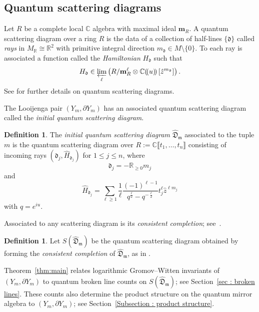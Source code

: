 \documentclass[11pt]{amsart}
\numberwithin{equation}{section}
\theoremstyle{plain}
\theoremstyle{remark}
\theoremstyle{definition}
\newtheorem{definition}[theorem]{Definition}
\newcommand\fd{\mathfrak d}
\newcommand\fD{\mathfrak D}
\newcommand\fm{\mathfrak m}
\newcommand{\CC}{\mathbb{C}}
\newcommand{\RR}{\mathbb{R}}
\begin{document}
\subsection{Quantum scattering diagrams}\label{Section : Quantum scattering diagrams}
Let $R$ be a complete local $\mathbb{C}$ algebra with maximal ideal $\mathbf{m}_R$. A quantum scattering diagram over a ring $R$ is the data of a collection of half-lines $\{\mathfrak{d}\}$ called \textit{rays} in $M_{\RR} \cong \mathbb{R}^2$ with primitive integral direction $m_{\mathfrak{d}} \in M\setminus \{0\}$. To each ray is associated a function called the \textit{Hamiltonian} $H_{\mathfrak{d}}$ such that
$$H_{\mathfrak{d}} \in \varprojlim_{\ell} \left(R/\mathbf{m}_{R}^{\ell} \otimes \CC (\!(u)\!)\left[\hat{z}^{m_{\mathfrak{d}}}\right]\right).$$
See \cite[Section 1]{bousseau2020quantumtrop} for further details on quantum scattering diagrams.

The Looijenga pair $(Y_m, \partial Y_m)$ has an associated quantum scattering diagram called the \textit{initial quantum scattering diagram}.

\begin{definition}
The \textit{initial quantum scattering diagram} $\hat{\fD}_{\fm}$ associated to the tuple $m$ is the quantum scattering diagram over $R:=\mathbb{C}\llbracket t_1, \ldots, t_n \rrbracket$
consisting of 
incoming rays 
$(\fd_j, \hat{H}_{\fd_j})$ for $1 \leqslant j \leqslant n$, where 
\[ \fd_j = - \mathbb{R}_{\geqslant 0} m_j \]
and 
\begin{equation}\label{eq : initial hamiltonians}
\hat{H}_{\fd_j} =
\sum_{\ell \geqslant 1}\frac{1}{\ell} \frac{(-1)^{\ell-1}}{q^{\frac{\ell}{2}}-q^{-\frac{\ell}{2}}} t_j^\ell \hat{z}^{\ell m_j} 
\end{equation}
with $q = e^{iu}$.
\end{definition}

Associated to any scattering diagram is its \textit{consistent completion}; see~\cite[Theorem 6]{kontsevich2006affine}.

\begin{definition}\label{Definition : scattering completion}
    Let $S(\hat{\fD}_{\fm})$ be the quantum scattering diagram obtained by forming the \textit{consistent completion} of $\hat{\fD}_{\fm}$, as in \cite{kontsevich2006affine}. 
\end{definition}  

Theorem~\ref{thm:main} relates logarithmic Gromov--Witten invariants of $(Y_m,\partial Y_m)$ to quantum broken line counts on $S(\hat{\fD}_{\fm})$; see Section~\ref{sec : broken lines}. These counts also determine the product structure on the quantum mirror algebra to $(Y_m,\partial Y_m)$; see Section~\ref{Subsection : product structure}.
\end{document}
